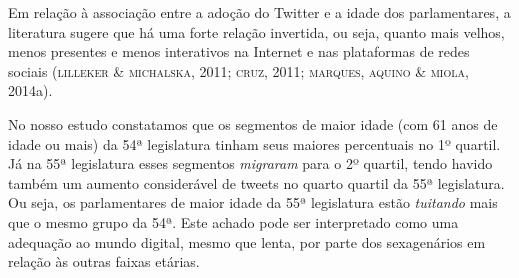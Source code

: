 Em relação à associação entre a adoção do Twitter e a idade dos
parlamentares, a literatura sugere que há uma forte relação invertida,
ou seja, quanto mais velhos, menos presentes e menos interativos na
Internet e nas plataformas de redes sociais (\textsc{lilleker \& michalska},
2011; \textsc{cruz}, 2011; \textsc{marques, aquino \& miola}, 2014a).

No nosso estudo constatamos que os segmentos de maior idade (com 61 anos
de idade ou mais) da 54ª legislatura tinham seus maiores percentuais no
1º quartil. Já na 55ª legislatura esses segmentos \textit{migraram} para o 2º
quartil, tendo havido também um aumento considerável de tweets no quarto
quartil da 55ª legislatura. Ou seja, os parlamentares de maior idade da
55ª legislatura estão \textit{tuitando} mais que o mesmo grupo da 54ª.
Este achado pode ser interpretado como uma adequação ao mundo digital,
mesmo que lenta, por parte dos sexagenários em relação às outras faixas
etárias.


